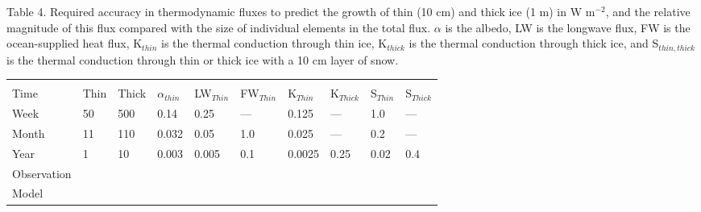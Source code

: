 \pagebreak
Table 4.  Required accuracy in thermodynamic fluxes to predict the 
growth of thin (10 cm) and thick ice (1 m) in W m$^{-2}$, and the
relative magnitude of this flux compared with the size of individual
elements in the total flux. $\alpha$ is the albedo, LW is the longwave
flux, FW is the ocean-supplied heat flux, K$_{thin}$ is the thermal
conduction through thin ice, K$_{thick}$ is the thermal conduction 
through thick ice, and S$_{thin, thick}$ is the thermal conduction 
through thin or
thick ice with a 10 cm layer of snow.
\begin{center}
\begin{tabular}{llllllllll}
&&&&&&&&&\\
Time & Thin & Thick & $\alpha_{thin}$ & 
     LW$_{Thin}$ &  FW$_{Thin}$ & K$_{Thin}$ & K$_{Thick}$  
                                & S$_{Thin}$ & S$_{Thick}$\\
\hline
\hline
Week & 50 & 500 & 0.14 & 0.25 &  --- &  0.125 & --- & 1.0 & --- \\
Month & 11 & 110 & 0.032 &0.05 &  1.0 & 0.025 & --- & 0.2 & ---\\
Year & 1 & 10 & 0.003 & 0.005 &  0.1 &  0.0025 & 0.25 & 0.02 & 0.4 \\
\hline
Observation &&&&&&&&\\
Model &&&&&&&&\\
\hline
\end{tabular}
\end{center}

